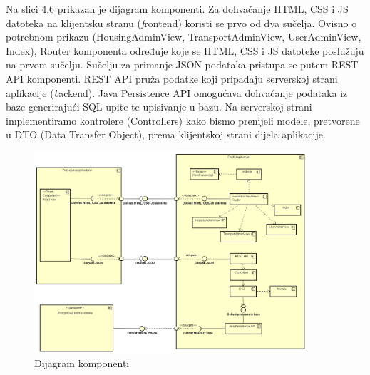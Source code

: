			Na slici 4.6 prikazan je dijagram komponenti. Za dohvaćanje HTML, CSS i JS datoteka na klijentsku stranu (\textit frontend) koristi se prvo od dva sučelja. Ovisno o potrebnom prikazu (HousingAdminView, TransportAdminView, UserAdminView, Index), Router komponenta određuje koje se HTML, CSS i JS datoteke poslužuju na prvom sučelju. Sučelju za primanje JSON podataka pristupa se putem REST API komponenti. REST API pruža podatke koji pripadaju serverskoj strani aplikacije (\textit backend). Java Persistence API omogućava dohvaćanje podataka iz baze generirajući SQL upite te upisivanje u bazu. Na serverskoj strani implementiramo kontrolere (Controllers) kako bismo prenijeli modele, pretvorene u DTO (Data Transfer Object), prema klijentskoj strani dijela aplikacije.
			 \begin{figure}[htbp]
			 	\centering
			 	\includegraphics[width=0.9\textwidth]{dijagrami/DijagramKomponenti.png}
			 	\caption{Dijagram komponenti}
			 	\label{fig:DijagramKomponenti}
			 \end{figure}